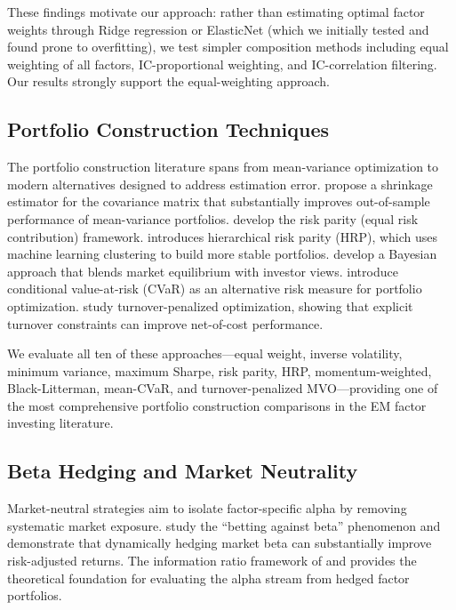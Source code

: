 \documentclass[12pt,a4paper]{article}
\begin{document}
These findings motivate our approach: rather than estimating optimal factor weights through Ridge regression or ElasticNet (which we initially tested and found prone to overfitting), we test simpler composition methods including equal weighting of all factors, IC-proportional weighting, and IC-correlation filtering. Our results strongly support the equal-weighting approach.

\subsection{Portfolio Construction Techniques}

The portfolio construction literature spans from \citet{markowitz1952} mean-variance optimization to modern alternatives designed to address estimation error. \citet{ledoitwolf2004} propose a shrinkage estimator for the covariance matrix that substantially improves out-of-sample performance of mean-variance portfolios. \citet{maillard2010} develop the risk parity (equal risk contribution) framework. \citet{lopezdeprado2016} introduces hierarchical risk parity (HRP), which uses machine learning clustering to build more stable portfolios. \citet{blacklitterman1992} develop a Bayesian approach that blends market equilibrium with investor views. \citet{rockafellar2000} introduce conditional value-at-risk (CVaR) as an alternative risk measure for portfolio optimization. \citet{olivaresdemiguel2018} study turnover-penalized optimization, showing that explicit turnover constraints can improve net-of-cost performance.

We evaluate all ten of these approaches---equal weight, inverse volatility, minimum variance, maximum Sharpe, risk parity, HRP, momentum-weighted, Black-Litterman, mean-CVaR, and turnover-penalized MVO---providing one of the most comprehensive portfolio construction comparisons in the EM factor investing literature.

\subsection{Beta Hedging and Market Neutrality}

Market-neutral strategies aim to isolate factor-specific alpha by removing systematic market exposure. \citet{frazzini2014} study the ``betting against beta'' phenomenon and demonstrate that dynamically hedging market beta can substantially improve risk-adjusted returns. The information ratio framework of \citet{grinold1989} and \citet{grinoldkahn2000} provides the theoretical foundation for evaluating the alpha stream from hedged factor portfolios.
\end{document}
